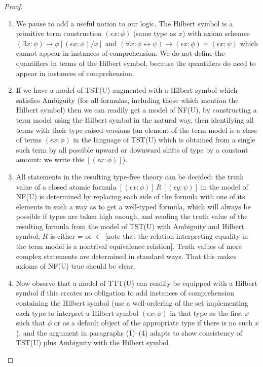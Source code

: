 \documentclass{article}
\theoremstyle{definition}
\theoremstyle{remark}
\begin{document}
\begin{proof}
\begin{enumerate}
\item We pause to add a useful notion to our logic.  The Hilbert symbol is a primitive term construction $(\epsilon x:\phi)$ (same type as $x$) with axiom schemes $(\exists x:\phi) \rightarrow \phi[(\epsilon x:\phi)/x]$ and $(\forall x:\phi \leftrightarrow \psi) \rightarrow (\epsilon x:\phi) = (\epsilon x:\psi)$ which cannot appear in instances of comprehension. We do not define the quantifiers in terms of the Hilbert symbol, because the quantifiers do need to appear in instances of comprehension.

\item If we have a model of TST(U) augmented with a Hilbert symbol  which satisfies Ambiguity (for all formulas, including those which mention the Hilbert symbol) then we can readily get a model of NF(U), by constructing a term model using the Hilbert symbol in the natural way, then identifying all terms with their type-raised versions (an element of the term model is a class of terms $(\epsilon x:\phi)$ in the language of TST(U) which is obtained from a single such term by all possible upward or downward shifts of type by a constant amount:  we write this
$[(\epsilon x:\phi)]$).


\item All statements in the resulting type-free theory can be decided:  the truth value of a closed atomic formula $[(\epsilon x:\phi)] \,R\, [(\epsilon y:\psi)]$ in the model of NF(U) is determined by replacing each side of the formula with one of its elements in such a way as to get a well-typed formula, which will always be possible if types are taken high enough, and reading the truth value of the resulting formula  from the model of TST(U) with Ambiguity and Hilbert symbol;  $R$ is either = or $\in$ [note that the relation interpreting equality in the term model is a nontrival equivalence relation].  Truth values of more complex statements are determined in standard ways.  That this makes axioms of NF(U) true should be clear.

\item  Now observe that a model of TTT(U) can readily be equipped with a Hilbert symbol if this creates no obligation to add instances of comprehension
containing the Hilbert symbol (use a well-ordering of the set implementing each type to interpret a Hilbert symbol  $(\epsilon x:\phi)$ in that type as the first $x$ such that $\phi$ or as a default object of the appropriate type if there is no such $x$), and the argument in paragraphs (1)--(4) adapts to show consistency of TST(U) plus Ambiguity with the Hilbert symbol.


\end{enumerate}
\end{proof}
\end{document}
